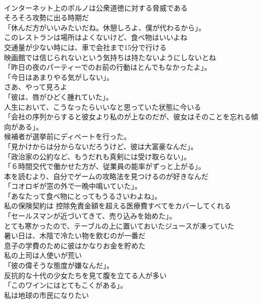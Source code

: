 \documentclass[8pt]{extreport}
\begin{document}
\begin{CJK}{UTF8}{min}
\\	インターネット上のポルノは公衆道徳に対する脅威である	
\\	そろそろ攻勢に出る時期だ	
\\	「休んだ方がいいみたいだね。休憩しろよ、僕が代わるから」。	
\\	このレストランは場所はよくないけど、食べ物はいいよね	
\\	交通量が少ない時には、車で会社まで15分で行ける	
\\	映画館では信じられないという気持ちは持たないようにしないとね	
\\	「昨日の夜のパーティーでのお前の行動はとんでもなかったよ」。	
\\	「今日はあまりやる気がしない」。	
\\	さあ、やって見ろよ	
\\	「彼は、唇がひどく腫れていた」。	
\\	人生において、こうなったらいいなと思っていた状態に今いる	
\\	「会社の序列からすると彼女より私のが上なのだが、彼女はそのことを忘れる傾向がある」。	
\\	候補者が選挙前にディベートを行った。	
\\	「見かけからは分からないだろうけど、彼は大富豪なんだ」。	
\\	「政治家の公約など、もうだれも真剣には受け取らない」。	
\\	「６時間交代で働かせた方が、従業員の能率がずっと上がる」。	
\\	本を読むより、自分でゲームの攻略法を見つけるのが好きなんだ	
\\	「コオロギが窓の外で一晩中鳴いていた」。	
\\	「あなたって食べ物にとってもうるさいわよね」。	
\\	私の保険契約は 控除免責金額を超える医療費すべてをカバーしてくれる	
\\	「セールスマンが近づいてきて、売り込みを始めた」。	
\\	とても寒かったので、テーブルの上に置いておいたジュースが凍っていた	
\\	暑い日は、木陰で冷たい物を飲むのが一番だ	
\\	息子の学費のために彼はかなりお金を貯めた	
\\	私の上司は人使いが荒い	
\\	「彼の偉そうな態度が嫌なんだ」。	
\\	反抗的な十代の少女たちを見て腹を立てる人が多い	
\\	「このワインにはとてもこくがある」。	
\\	私は地球の市民になりたい	

\end{CJK}
\end{document}
